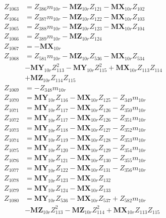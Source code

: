 \begin{multicols}{2}
\begin{align}
Z_{1063} &= Z_{386}m_{10r} - \mathbf{MZ}_{10r}Z_{121} - \mathbf{MX}_{10r}Z_{102} \nonumber \\
Z_{1064} &= Z_{387}m_{10r} - \mathbf{MZ}_{10r}Z_{122} - \mathbf{MX}_{10r}Z_{103} \nonumber \\
Z_{1065} &= Z_{388}m_{10r} - \mathbf{MZ}_{10r}Z_{123} - \mathbf{MX}_{10r}Z_{104} \nonumber \\
Z_{1066} &= Z_{389}m_{10r} - \mathbf{MZ}_{10r}Z_{124} \nonumber \\
Z_{1067} &= -\mathbf{MX}_{10r} \nonumber \\
Z_{1068} &= Z_{581}m_{10r} - \mathbf{MZ}_{10r}Z_{536} - \mathbf{MX}_{10r}Z_{534}  \nonumber \\
&- \mathbf{MY}_{10r}Z_{113}^2 - \mathbf{MY}_{10r}Z_{115}^2 + \mathbf{MX}_{10r}Z_{113}Z_{114}  \nonumber \\
&+ \mathbf{MZ}_{10r}Z_{114}Z_{115} \nonumber \\
Z_{1069} &= -Z_{348}m_{10r} \nonumber \\
Z_{1070} &= \mathbf{MY}_{10r}Z_{116} - \mathbf{MX}_{10r}Z_{125} - Z_{349}m_{10r} \nonumber \\
Z_{1071} &= \mathbf{MY}_{10r}Z_{117} - \mathbf{MX}_{10r}Z_{126} - Z_{350}m_{10r} \nonumber \\
Z_{1072} &= \mathbf{MY}_{10r}Z_{117} - \mathbf{MX}_{10r}Z_{126} - Z_{351}m_{10r} \nonumber \\
Z_{1073} &= \mathbf{MY}_{10r}Z_{118} - \mathbf{MX}_{10r}Z_{127} - Z_{352}m_{10r} \nonumber \\
Z_{1074} &= \mathbf{MY}_{10r}Z_{119} - \mathbf{MX}_{10r}Z_{128} - Z_{353}m_{10r} \nonumber \\
Z_{1075} &= \mathbf{MY}_{10r}Z_{120} - \mathbf{MX}_{10r}Z_{129} - Z_{354}m_{10r} \nonumber \\
Z_{1076} &= \mathbf{MY}_{10r}Z_{121} - \mathbf{MX}_{10r}Z_{130} - Z_{355}m_{10r} \nonumber \\
Z_{1077} &= \mathbf{MY}_{10r}Z_{122} - \mathbf{MX}_{10r}Z_{131} - Z_{356}m_{10r} \nonumber \\
Z_{1078} &= \mathbf{MY}_{10r}Z_{123} - \mathbf{MX}_{10r}Z_{132} \nonumber \\
Z_{1079} &= \mathbf{MY}_{10r}Z_{124} - \mathbf{MX}_{10r}Z_{133} \nonumber \\
Z_{1080} &= \mathbf{MY}_{10r}Z_{536} - \mathbf{MX}_{10r}Z_{537} + Z_{582}m_{10r}  \nonumber \\
&- \mathbf{MZ}_{10r}Z_{113}^2 - \mathbf{MZ}_{10r}Z_{114}^2 + \mathbf{MX}_{10r}Z_{113}Z_{115}  \nonumber \\

\end{align}
\end{multicols}
